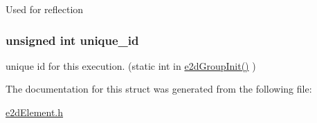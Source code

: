Used for reflection \hypertarget{structe2dElement_a300bb6cf5b184e200523e9bce8346dc4}{
\subsubsection[{unique\-\_\-id}]{\setlength{\rightskip}{0pt plus 5cm}unsigned int {\bf unique\-\_\-id}}}\label{structe2dElement_a300bb6cf5b184e200523e9bce8346dc4}
unique id for this execution. (static int in \hyperlink{group__e2dGroup_ga25406e9ff8a7746af03833e40ccf259a}{e2d\-Group\-Init()} ) 

The documentation for this struct was generated from the following file\-:\begin{DoxyCompactItemize}
\item 
\hyperlink{e2dElement_8h}{e2d\-Element.\-h}\end{DoxyCompactItemize}
